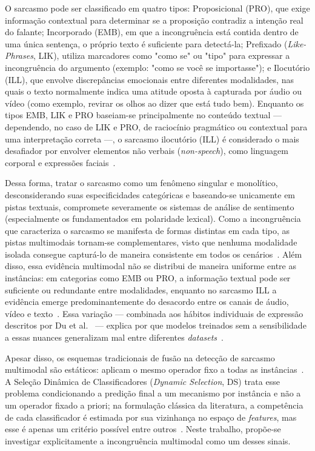 \documentclass[conference]{IEEEtran}
\begin{document}
O sarcasmo pode ser classificado em quatro tipos: Proposicional (PRO), que exige informação contextual para determinar se a proposição contradiz a intenção real do falante; Incorporado (EMB), em que a incongruência está contida dentro de uma única sentença, o próprio texto é suficiente para detectá-la; Prefixado (\textit{Like-Phrases}, LIK), utiliza marcadores como "como se" ou "tipo" para expressar a incongruência do argumento (exemplo: "como se você se importasse"); e Ilocutório (ILL), que envolve discrepâncias emocionais entre diferentes modalidades, nas quais o texto normalmente indica uma atitude oposta à capturada por áudio ou vídeo (como exemplo, revirar os olhos ao dizer que está tudo bem). Enquanto os tipos EMB, LIK e PRO baseiam-se principalmente no conteúdo textual — dependendo, no caso de LIK e PRO, de raciocínio pragmático ou contextual para uma interpretação correta —, o sarcasmo ilocutório (ILL) é considerado o mais desafiador por envolver elementos não verbais (\textit{non-speech}), como linguagem corporal e expressões faciais~\cite{chang2026, ray2022multimodal, bhosale2023mustard++}.

Dessa forma, tratar o sarcasmo como um fenômeno singular e monolítico, desconsiderando suas especificidades categóricas e baseando-se unicamente em pistas textuais, compromete severamente os sistemas de análise de sentimento (especialmente os fundamentados em polaridade lexical). Como a incongruência que caracteriza o sarcasmo se manifesta de formas distintas em cada tipo, as pistas multimodais tornam-se complementares, visto que nenhuma modalidade isolada consegue capturá-lo de maneira consistente em todos os cenários~\cite{ray2022multimodal, castro2019towards}. Além disso, essa evidência multimodal não se distribui de maneira uniforme entre as instâncias: em categorias como EMB ou PRO, a informação textual pode ser suficiente ou redundante entre modalidades, enquanto no sarcasmo ILL a evidência emerge predominantemente do desacordo entre os canais de áudio, vídeo e texto~\cite{ray2022multimodal, yu2024mmoe}. Essa variação — combinada aos hábitos individuais de expressão descritos por Du et al.~\cite{du2022effective} — explica por que modelos treinados sem a sensibilidade a essas nuances generalizam mal entre diferentes \textit{datasets}~\cite{jang2024generalizable}.

Apesar disso, os esquemas tradicionais de fusão na detecção de sarcasmo multimodal são estáticos: aplicam o mesmo operador fixo a todas as instâncias~\cite{farabi2024survey}. A Seleção Dinâmica de Classificadores (\textit{Dynamic Selection}, DS) trata esse problema condicionando a predição final a um mecanismo por instância e não a um operador fixado a priori; na formulação clássica da literatura, a competência de cada classificador é estimada por sua vizinhança no espaço de \textit{features}, mas esse é apenas um critério possível entre outros~\cite{britto2014dynamic, cruz2018dynamic}.  Neste trabalho, propõe-se investigar explicitamente a incongruência multimodal como um desses sinais.
\end{document}
